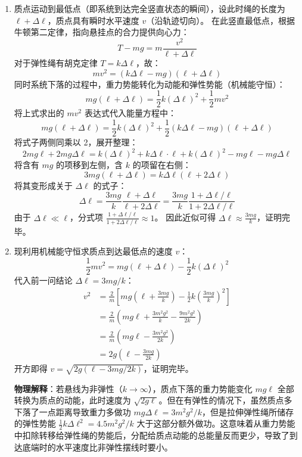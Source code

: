 \begin{solution}
\begin{enumerate}
    \item[(a)] 质点运动到最低点（即系统到达完全竖直状态的瞬间），设此时绳的长度为 $\ell + \Delta\ell$，质点具有瞬时水平速度 $v$（沿轨迹切向）。
    在此竖直最低点，根据牛顿第二定律，指向悬挂点的合力提供向心力：
    $$ T - mg = m \frac{v^2}{\ell + \Delta\ell} $$
    对于弹性绳有胡克定律 $T = k \Delta\ell$，故：
    $$ m v^2 = (k \Delta\ell - mg)(\ell + \Delta\ell) $$
    同时系统下落的过程中，重力势能转化为动能和弹性势能（机械能守恒）：
    $$ mg(\ell + \Delta\ell) = \frac{1}{2} k (\Delta\ell)^2 + \frac{1}{2} m v^2 $$
    将上式求出的 $m v^2$ 表达式代入能量方程中：
    $$ mg(\ell + \Delta\ell) = \frac{1}{2} k (\Delta\ell)^2 + \frac{1}{2} (k \Delta\ell - mg)(\ell + \Delta\ell) $$
    将式子两侧同乘以 2，展开整理：
    $$ 2mg\ell + 2mg\Delta\ell = k(\Delta\ell)^2 + k\Delta\ell \cdot \ell + k(\Delta\ell)^2 - mg\ell - mg\Delta\ell $$
    将含有 $mg$ 的项移到左侧，含 $k$ 的项留在右侧：
    $$ 3mg(\ell + \Delta\ell) = k\Delta\ell (\ell + 2\Delta\ell) $$
    将其变形成关于 $\Delta\ell$ 的式子：
    $$ \Delta\ell = \frac{3mg}{k} \frac{\ell + \Delta\ell}{\ell + 2\Delta\ell} = \frac{3mg}{k} \frac{1 + \Delta\ell/\ell}{1 + 2\Delta\ell/\ell} $$
    由于 $\Delta\ell \ll \ell$，分式项 $\frac{1 + \Delta\ell/\ell}{1 + 2\Delta\ell/\ell} \approx 1$。
    因此近似可得 $\Delta \ell \approx \frac{3mg}{k}$，证明完毕。

    \item[(b)] 现利用机械能守恒求质点到达最低点的速度 $v$：
    $$ \frac{1}{2} m v^2 = mg(\ell + \Delta\ell) - \frac{1}{2} k (\Delta\ell)^2 $$
    代入前一问结论 $\Delta \ell = 3mg/k$：
    \begin{align*}
        v^2 &= \frac{2}{m} \left[ mg \left( \ell + \frac{3mg}{k} \right) - \frac{1}{2} k \left( \frac{3mg}{k} \right)^2 \right] \\
            &= \frac{2}{m} \left( mg\ell + \frac{3m^2g^2}{k} - \frac{9m^2g^2}{2k} \right) \\
            &= \frac{2}{m} \left( mg\ell - \frac{3m^2g^2}{2k} \right) \\
            &= 2g \left( \ell - \frac{3mg}{2k} \right)
    \end{align*}
    开方即得 $v = \sqrt{2g(\ell - 3mg/2k)}$，证明完毕。

    \textbf{物理解释}：若悬线为非弹性（$k \to \infty$），质点下落的重力势能变化 $mg\ell$ 全部转换为质点的动能，此时速度为 $\sqrt{2g\ell}$。但在有弹性的情况下，虽然质点多下落了一点距离导致重力多做功 $mg\Delta\ell = 3m^2g^2/k$，但是拉伸弹性绳所储存的弹性势能 $\frac{1}{2}k\Delta\ell^2 = 4.5m^2g^2/k$ 大于这部分额外做功。这意味着从重力势能中扣除转移给弹性绳的势能后，分配给质点动能的总能量反而更少，导致了到达底端时的水平速度比非弹性摆线时要小。
\end{enumerate}
\end{solution}

